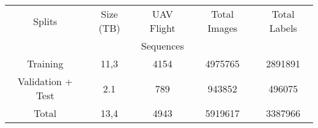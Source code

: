 
  \begin{tabular}{ c c c c c }
    \toprule[1.5pt]
    Splits    & Size (TB) & UAV Flight & Total Images & Total Labels\\
              &           & Sequences  &              & \\
    \midrule
    Training & 11,3 & 4154 & 4975765 & 2891891\\

    Validation + Test &2.1 &789 & 943852 & 496075\\
    \midrule
    Total &13,4 &4943 & 5919617 & 3387966\\
    \bottomrule[1.5pt]
  \end{tabular}
